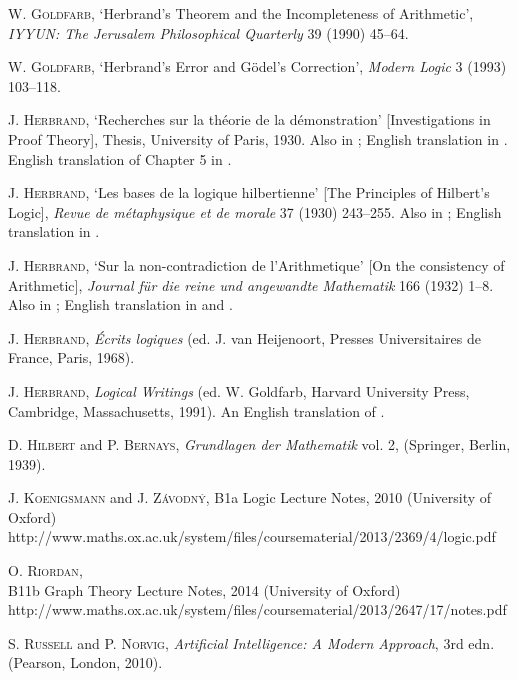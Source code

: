\documentclass[a4paper,12pt]{report}
\theoremstyle{definition}
\begin{document}
\begin{thebibliography}{99}
\textsc{W. Goldfarb},
`Herbrand's Theorem and the Incompleteness of Arithmetic',
\emph{IYYUN: The Jerusalem Philosophical Quarterly} 39 
(1990)
45--64.

\textsc{W. Goldfarb},
`Herbrand's Error and G\"{odel's} Correction',
\emph{Modern Logic} 3
(1993)
103--118.

\textsc{J. Herbrand},
`Recherches sur la th\'e{orie} de la d\'e{monstration}' [Investigations in Proof Theory],
Thesis, University of Paris, 1930.
Also in \cite{herb french}; English translation in \cite{herb english}. English translation of Chapter 5 in \cite{f to g}.

\textsc{J. Herbrand},
`Les bases de la logique hilbertienne' [The Principles of Hilbert's Logic],
\emph{Revue de m\'e{taphysique} et de morale} 37
(1930)
243--255.
Also in \cite{herb french}; English translation in \cite{herb english}.

\textsc{J. Herbrand},
`Sur la non-contradiction de l'Arithmetique' [On the consistency of Arithmetic],
\emph{Journal f\"u{r} die reine und angewandte Mathematik} 166
(1932)
1--8.
Also in \cite{herb french}; English translation in \cite{herb english} and \cite{f to g}.

\textsc{J. Herbrand},
\emph{\'E{crits} logiques}
(ed. J. van Heijenoort, Presses Universitaires de France, Paris, 1968).

\textsc{J. Herbrand},
\emph{Logical Writings}
(ed. W. Goldfarb, Harvard University Press, Cambridge, Massachusetts, 1991). 
An English translation of \cite{herb french}.

\textsc{D. Hilbert} and \textsc{P. Bernays}, 
\emph{Grundlagen der Mathematik} vol. 2, 
(Springer, Berlin, 1939).

\textsc{J. Koenigsmann} and \textsc{J. Z\'a{vodn}\'y}, 
B1a Logic Lecture Notes, 
2010 
(University of Oxford) 
http://www.maths.ox.ac.uk/system/files/coursematerial/2013/2369/4/logic.pdf

\textsc{O. Riordan}, \\
B11b Graph Theory Lecture Notes,
2014
(University of Oxford)
http://www.maths.ox.ac.uk/system/files/coursematerial/2013/2647/17/notes.pdf

\textsc{S. Russell} and \textsc{P. Norvig},
\emph{Artificial Intelligence: A Modern Approach}, 3rd edn.
(Pearson, London, 2010).


\end{thebibliography}
\end{document}
